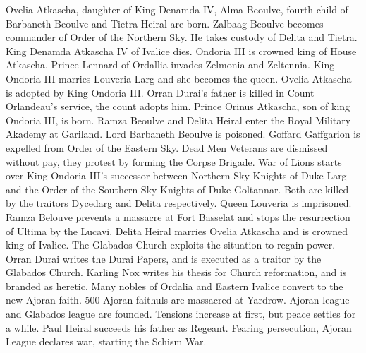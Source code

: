 %
 Ovelia Atkascha, daughter of King Denamda IV, Alma Beoulve, fourth child of Barbaneth Beoulve and Tietra Heiral are born. \nlwb
%
 Zalbaag Beoulve becomes commander of Order of the Northern Sky. He takes custody of Delita and Tietra. King Denamda Atkascha IV of Ivalice dies. Ondoria III is crowned king of House Atkascha. Prince Lennard of Ordallia invades Zelmonia and Zeltennia. King Ondoria III marries Louveria Larg and she becomes the queen.\nlwb
%
 Ovelia Atkascha is adopted by King Ondoria III. Orran Durai's father is killed in Count Orlandeau's service, the count adopts him.\nlwb
%
 Prince Orinus Atkascha, son of king Ondoria III, is born. Ramza Beoulve and Delita Heiral enter the Royal Military Akademy at Gariland. Lord Barbaneth Beoulve is poisoned. Goffard Gaffgarion is expelled from Order of the Eastern Sky. Dead Men Veterans are dismissed without pay, they protest by forming the Corpse Brigade.\nlwb
%
 War of Lions starts over King Ondoria III's successor between Northern Sky Knights of Duke Larg and the Order of the Southern Sky Knights of Duke Goltannar. 
Both are killed by the traitors Dycedarg and Delita respectively. Queen Louveria is imprisoned.
Ramza Belouve prevents a massacre at Fort Basselat and stops the resurrection of Ultima by the Lucavi. 
\nlwb
%
 Delita Heiral marries Ovelia Atkascha and is crowned king of Ivalice. The Glabados Church exploits the situation to regain power.
\nlwb
%
 Orran Durai writes the Durai Papers, and is executed as a traitor by the Glabados Church.\nlwb
%
 Karling Nox writes his thesis for Church reformation, and is branded as heretic. Many nobles of Ordalia and Eastern Ivalice convert to the new Ajoran faith.\nlwb
%
 500 Ajoran faithuls are massacred at Yardrow. Ajoran league and Glabados league are founded.
Tensions increase at first, but peace settles for a while.
\nlwb
%
 Paul Heiral succeeds his father as Regeant. 
Fearing persecution, Ajoran League declares war, starting the Schism War.
%
\clearpage
%
%
%
